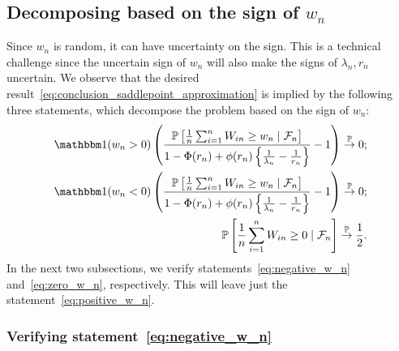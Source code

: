 \documentclass[12pt]{article}
\theoremstyle{definition}
\def\P{\mathbb{P}}
\def\P{\mathbb{P}}
\renewcommand{\P}{\mathbb{P}}							%
\newcommand{\indicator}{\mathbbm 1}						%
\newcommand{\convp}{\overset{\mathbb{P}}{\rightarrow}}             %
\begin{document}
\subsection{Decomposing based on the sign of $w_n$}\label{sec:sign_decomposition}

Since $w_n$ is random, it can have uncertainty on the sign. This is a technical challenge since the uncertain sign of $w_n$ will also make the signs of $\lambda_n,r_n$ uncertain. We observe that the desired result~\eqref{eq:conclusion_saddlepoint_approximation} is implied by the following three statements, which decompose the problem based on the sign of $w_n$:
\begin{align}
\indicator(w_n > 0)\left(\frac{\P\left[\frac1n \sum_{i = 1}^n W_{in} \geq w_n \mid \mathcal F_n\right]}{1-\Phi(r_n)+\phi(r_n)\left\{\frac{1}{\lambda_n}-\frac{1}{r_n}\right\}}-1\right) \convp 0; \label{eq:positive_w_n} \\
\indicator(w_n < 0)\left(\frac{\P\left[\frac1n \sum_{i = 1}^n W_{in} \geq w_n \mid \mathcal F_n\right]}{1-\Phi(r_n)+\phi(r_n)\left\{\frac{1}{\lambda_n}-\frac{1}{r_n}\right\}}-1\right) \convp 0; \label{eq:negative_w_n} \\
\P\left[\frac1n \sum_{i = 1}^n W_{in} \geq 0 \mid \mathcal F_n \right] \convp \frac12. \label{eq:zero_w_n} 
\end{align}
In the next two subsections, we verify statements~\eqref{eq:negative_w_n} and~\eqref{eq:zero_w_n}, respectively. This will leave just the statement~\eqref{eq:positive_w_n}. 

\subsubsection{Verifying statement~\eqref{eq:negative_w_n}}
\end{document}
